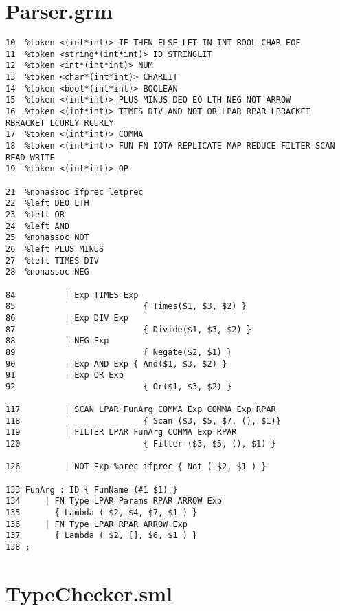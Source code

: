 \documentclass[paper=a4, fontsize=11pt]{scrartcl} %
\numberwithin{equation}{section} %
\numberwithin{figure}{section} %
\numberwithin{table}{section} %
\begin{document}
\pagebreak
\chapter{Parser.grm}
\begin{lstlisting}
10  %token <(int*int)> IF THEN ELSE LET IN INT BOOL CHAR EOF
11  %token <string*(int*int)> ID STRINGLIT
12  %token <int*(int*int)> NUM
13  %token <char*(int*int)> CHARLIT
14  %token <bool*(int*int)> BOOLEAN
15  %token <(int*int)> PLUS MINUS DEQ EQ LTH NEG NOT ARROW
16  %token <(int*int)> TIMES DIV AND NOT OR LPAR RPAR LBRACKET RBRACKET LCURLY RCURLY
17  %token <(int*int)> COMMA
18  %token <(int*int)> FUN FN IOTA REPLICATE MAP REDUCE FILTER SCAN READ WRITE 
19  %token <(int*int)> OP

21  %nonassoc ifprec letprec
22  %left DEQ LTH
23  %left OR 
24  %left AND
25  %nonassoc NOT
26  %left PLUS MINUS
27  %left TIMES DIV
28  %nonassoc NEG

84          | Exp TIMES Exp  
85                          { Times($1, $3, $2) }
86          | Exp DIV Exp  
87                          { Divide($1, $3, $2) }
88          | NEG Exp  
89                          { Negate($2, $1) }
90          | Exp AND Exp { And($1, $3, $2) }
91          | Exp OR Exp 
92                          { Or($1, $3, $2) }

117	        | SCAN LPAR FunArg COMMA Exp COMMA Exp RPAR 
118	                        { Scan ($3, $5, $7, (), $1)} 
119	        | FILTER LPAR FunArg COMMA Exp RPAR 
120	                        { Filter ($3, $5, (), $1) } 

126	        | NOT Exp %prec ifprec { Not ( $2, $1 ) }   

133	FunArg : ID { FunName (#1 $1) } 
134	    | FN Type LPAR Params RPAR ARROW Exp 
135	      { Lambda ( $2, $4, $7, $1 ) } 
136	    | FN Type LPAR RPAR ARROW Exp 
137	      { Lambda ( $2, [], $6, $1 ) } 
138	;

\end{lstlisting}

\pagebreak
\chapter{TypeChecker.sml}
\end{document}
